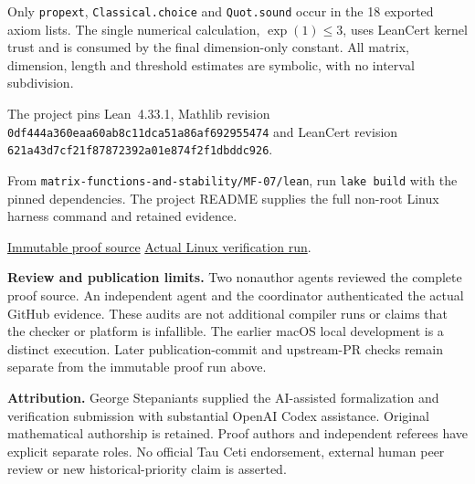 \documentclass[11pt,a4paper]{article}
\begin{document}
Only \texttt{propext}, \texttt{Classical.choice} and \texttt{Quot.sound}
occur in the 18 exported axiom lists. The single numerical calculation,
$\exp(1)\le3$, uses LeanCert kernel trust and is consumed by the final
dimension-only constant. All matrix, dimension, length and threshold estimates
are symbolic, with no interval subdivision.

The project pins Lean~4.33.1, Mathlib revision
\texttt{0df444a360eaa60ab8c11dca51a86af692955474} and LeanCert revision
\texttt{621a43d7cf21f87872392a01e874f2f1dbddc926}.

From \nolinkurl{matrix-functions-and-stability/MF-07/lean}, run
\texttt{lake build} with the pinned dependencies. The project README supplies
the full non-root Linux harness command and retained evidence.

\href{https://github.com/sgstepaniants/OpenProblemsInNLA/blob/b2b9acc83ad7d6b7d3888de8390475a30c720af8/matrix-functions-and-stability/MF-07/lean/Solution.lean}{Immutable proof source}
\quad\textbullet\quad
\href{https://github.com/sgstepaniants/OpenProblemsInNLA/actions/runs/35172783207/job/105047879291}{Actual Linux verification run}.

\textbf{Review and publication limits.} Two nonauthor agents reviewed the
complete proof source. An independent agent and the coordinator authenticated
the actual GitHub evidence. These audits are not additional compiler runs or
claims that the checker or platform is infallible. The earlier macOS local
development is a distinct execution. Later publication-commit and upstream-PR
checks remain separate from the immutable proof run above.

\textbf{Attribution.} George Stepaniants supplied the AI-assisted formalization
and verification submission with substantial OpenAI Codex assistance.
Original mathematical authorship is retained. Proof authors and independent
referees have explicit separate roles. No official Tau Ceti endorsement,
external human peer review or new historical-priority claim is asserted.
\end{document}
